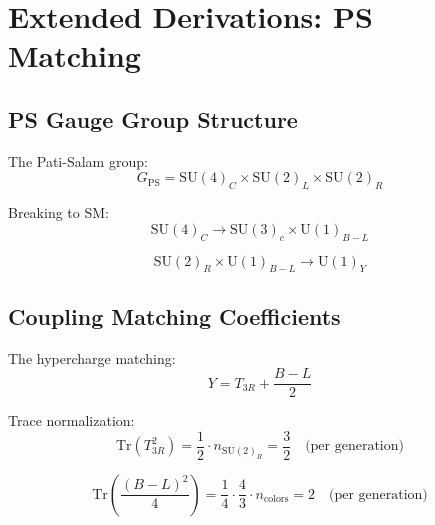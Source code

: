 \documentclass[11pt,a4paper]{article}
\theoremstyle{definition}
\begin{document}
\section{Extended Derivations: PS Matching}
\label{sec:ps_matching}

\subsection{PS Gauge Group Structure}
\label{subsec:ps_group}

The Pati-Salam group:
\begin{equation}
\label{eq:ps_group}
G_{\text{PS}} = \text{SU}(4)_C \times \text{SU}(2)_L \times \text{SU}(2)_R
\end{equation}

Breaking to SM:
\begin{equation}
\label{eq:ps_breaking}
\text{SU}(4)_C \to \text{SU}(3)_c \times \text{U}(1)_{B-L}
\end{equation}

\begin{equation}
\label{eq:ps_breaking_2}
\text{SU}(2)_R \times \text{U}(1)_{B-L} \to \text{U}(1)_Y
\end{equation}

\subsection{Coupling Matching Coefficients}
\label{subsec:matching_coeff}

The hypercharge matching:
\begin{equation}
\label{eq:Y_embedding}
Y = T_{3R} + \frac{B-L}{2}
\end{equation}

Trace normalization:
\begin{equation}
\label{eq:trace_T3R}
\text{Tr}(T_{3R}^2) = \frac{1}{2} \cdot n_{\text{SU}(2)_R} = \frac{3}{2} \quad \text{(per generation)}
\end{equation}

\begin{equation}
\label{eq:trace_BL}
\text{Tr}\left(\frac{(B-L)^2}{4}\right) = \frac{1}{4} \cdot \frac{4}{3} \cdot n_{\text{colors}} = 2 \quad \text{(per generation)}
\end{equation}
\end{document}
